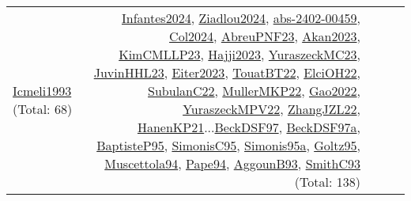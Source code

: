 {\begin{longtable}{p{3cm}r>{\raggedright\arraybackslash}p{6cm}>{\raggedright\arraybackslash}p{6cm}>{\raggedright\arraybackslash}p{8cm}}
\hyperref[detail:Icmeli1993]{Icmeli1993} (Total: 68) & \hyperref[detail:Infantes2024]{Infantes2024}, \hyperref[detail:Ziadlou2024]{Ziadlou2024}, \hyperref[detail:abs-2402-00459]{abs-2402-00459}, \hyperref[detail:Col2024]{Col2024}, \hyperref[detail:AbreuPNF23]{AbreuPNF23}, \hyperref[detail:Akan2023]{Akan2023}, \hyperref[detail:KimCMLLP23]{KimCMLLP23}, \hyperref[detail:Hajji2023]{Hajji2023}, \hyperref[detail:YuraszeckMC23]{YuraszeckMC23}, \hyperref[detail:JuvinHHL23]{JuvinHHL23}, \hyperref[detail:Eiter2023]{Eiter2023}, \hyperref[detail:TouatBT22]{TouatBT22}, \hyperref[detail:ElciOH22]{ElciOH22}, \hyperref[detail:SubulanC22]{SubulanC22}, \hyperref[detail:MullerMKP22]{MullerMKP22}, \hyperref[detail:Gao2022]{Gao2022}, \hyperref[detail:YuraszeckMPV22]{YuraszeckMPV22}, \hyperref[detail:ZhangJZL22]{ZhangJZL22}, \hyperref[detail:HanenKP21]{HanenKP21}...\hyperref[detail:BeckDSF97]{BeckDSF97}, \hyperref[detail:BeckDSF97a]{BeckDSF97a}, \hyperref[detail:BaptisteP95]{BaptisteP95}, \hyperref[detail:SimonisC95]{SimonisC95}, \hyperref[detail:Simonis95a]{Simonis95a}, \hyperref[detail:Goltz95]{Goltz95}, \hyperref[detail:Muscettola94]{Muscettola94}, \hyperref[detail:Pape94]{Pape94}, \hyperref[detail:AggounB93]{AggounB93}, \hyperref[detail:SmithC93]{SmithC93} (Total: 138)\\

\end{longtable}}
